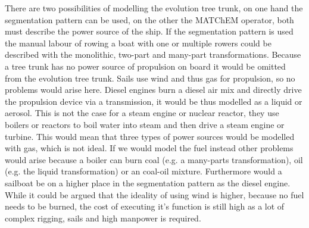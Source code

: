 \documentclass[11pt,a4paper]{article}
\begin{document}
There are two possibilities of modelling the evolution tree trunk, on one hand
the segmentation pattern can be used, on the other the MATChEM operator, both
must describe the power source of the ship. If the segmentation pattern is
used the manual labour of rowing a boat with one or multiple rowers could be
described with the monolithic, two-part and many-part transformations. Because
a tree trunk has no power source of propulsion on board it would be omitted
from the evolution tree trunk. Sails use wind and thus gas for propulsion, so
no problems would arise here. Diesel engines burn a diesel air mix and
directly drive the propulsion device via a transmission, it would be thus
modelled as a liquid or aerosol. This is not the case for a steam engine or
nuclear reactor, they use boilers or reactors to boil water into steam and
then drive a steam engine or turbine. This would mean that three types of
power sources would be modelled with gas, which is not ideal. If we would
model the fuel instead other problems would arise because a boiler can burn
coal (e.g. a many-parts transformation), oil (e.g. the liquid transformation)
or an coal-oil mixture. Furthermore would a sailboat be on a higher place in
the segmentation pattern as the diesel engine. While it could be argued that
the ideality of using wind is higher, because no fuel needs to be burned, the
cost of executing it's function is still high as a lot of complex rigging,
sails and high manpower is required.
\end{document}

